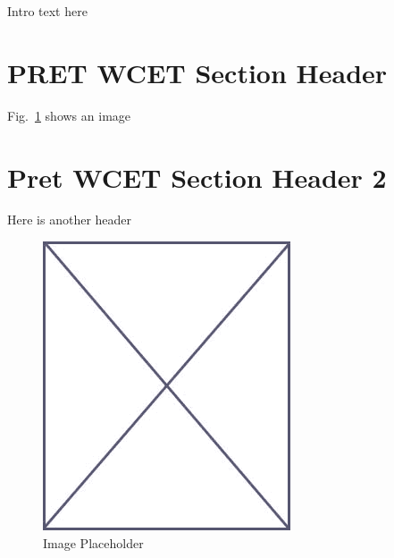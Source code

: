 Intro text here

\section{PRET WCET Section Header}
\label{sec:pret_wcet_sec_1}

Fig.~\ref{fig:placeholder_pret_wcet} shows an image

\section{Pret WCET Section Header 2}
\label{sec:pret_wcet_sec_2}

Here is another header


\begin{figure}
\begin{center}
\vspace{-32pt}
\includegraphics[scale=.45]{figs/placeholder}
\end{center}
\vspace{-12pt}
\caption{Image Placeholder}
\label{fig:placeholder_pret_wcet}
\end{figure}
